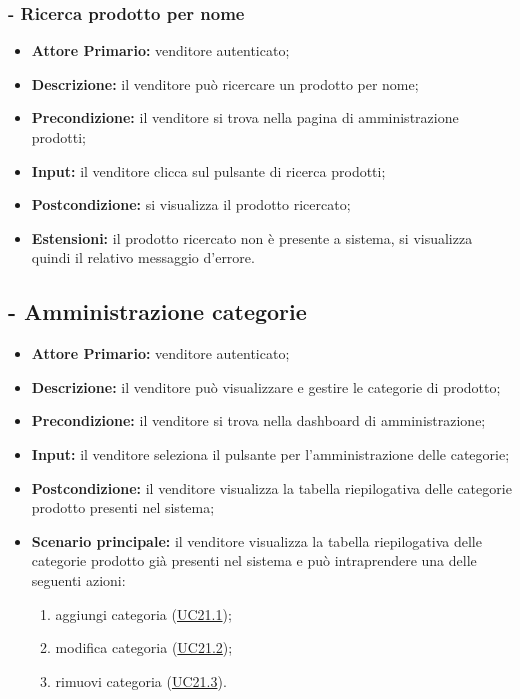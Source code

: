 \subsubsection{- Ricerca prodotto per nome}
\begin{itemize}
    \item \textbf{Attore Primario:} venditore autenticato;
    \item \textbf{Descrizione:} il venditore può ricercare un prodotto per nome;
    \item \textbf{Precondizione:} il venditore si trova nella pagina di amministrazione prodotti;
    \item \textbf{Input:} il venditore clicca sul pulsante di ricerca prodotti;
    \item \textbf{Postcondizione:} si visualizza il prodotto ricercato;
    \item \textbf{Estensioni:} il prodotto ricercato non è presente a sistema, si visualizza quindi il relativo messaggio d'errore.
\end{itemize}

\stepUserCase
\subsection{ - Amministrazione categorie}
\begin{itemize}
    \item \textbf{Attore Primario:} venditore autenticato;
    \item \textbf{Descrizione:}  il venditore può visualizzare e gestire le categorie di prodotto;
    \item \textbf{Precondizione:}  il venditore si trova nella dashboard di amministrazione;
    \item \textbf{Input:} il venditore seleziona il pulsante per l'amministrazione delle categorie;
    \item \textbf{Postcondizione:} il venditore visualizza la tabella riepilogativa delle categorie prodotto presenti nel sistema;
    \item \textbf{Scenario principale:} il venditore visualizza la tabella riepilogativa delle categorie prodotto già presenti nel sistema e può intraprendere una delle seguenti azioni:
          \begin{enumerate}
              \item aggiungi categoria (\hyperref[UC21.1]{UC21.1});
              \item modifica categoria (\hyperref[UC21.2]{UC21.2});
              \item rimuovi categoria (\hyperref[UC21.3]{UC21.3}).
          \end{enumerate}
\end{itemize}

